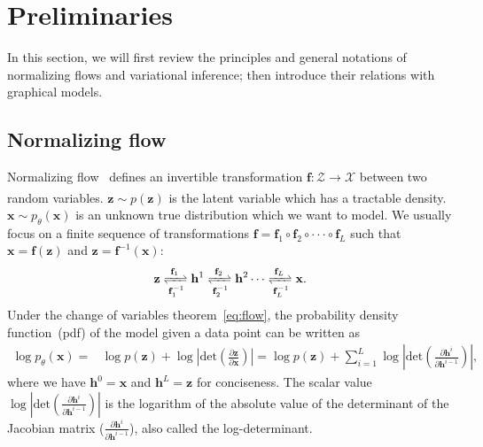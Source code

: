\documentclass{article} %
\begin{document}
\section{Preliminaries}
In this section, we will first review the principles and general notations of normalizing flows and variational inference; then introduce their relations with graphical models.
\subsection{Normalizing flow}
Normalizing flow~\citep{kingma2018glow,rezende2015variational} defines an invertible transformation $\mathbf{f}: \mathcal{Z} \xrightarrow[]{} \mathcal{X}$ between two random variables. $\mathbf{z} \sim p(\mathbf{z})$ is the latent variable which has a tractable density. $\mathbf{x} \sim p_\theta(\mathbf{x})$ is an unknown true distribution which we want to model. We usually focus on a finite sequence of transformations $\mathbf{f}=\mathbf{f}_1  \circ \mathbf{f}_2 \circ   \cdot  \cdot \cdot     \circ   \mathbf{f}_L$ such that $\mathbf{x}=\mathbf{f}(\mathbf{z})$ and $\mathbf{z}=\mathbf{f}^{-1}(\mathbf{x})$:
\begin{align*}
    \mathbf{z} \xrightleftharpoons[\mathbf{f}_1^{-1}]{\mathbf{f}_1} \mathbf{h}^1 \xrightleftharpoons[\mathbf{f}_2^{-1}]{\mathbf{f}_2} \mathbf{h}^2 \cdots \xrightleftharpoons[\mathbf{f}_L^{-1}]{\mathbf{f}_L}\mathbf{x}.
\end{align*}
Under the change of variables theorem~\eqref{eq:flow}, the probability density function~(pdf) of the model given a data point can be written as 
\begin{align}\label{eq:flow}
\log p_\theta(\mathbf{x}) =& \log p(\mathbf{z})  + \log | \text{det} ( \frac{\partial \mathbf{z} }{\partial \mathbf{x}} ) | 
=  \log p(\mathbf{z}) + \sum_{i=1}^L\log | \text{det} ( \frac{\partial \mathbf{h}^i } {\partial \mathbf{h}^{i-1}}) | ,
\end{align}
where we have $\mathbf{h}^0 = \mathbf{x}$ and $\mathbf{h}^L = \mathbf{z}$ for conciseness. The scalar value $\log |\text{det}( \frac{\partial \mathbf{h}^i}{\partial \mathbf{h}^{i-1}})|$ is the logarithm of the absolute value of the determinant of the Jacobian matrix ($\frac{\partial \mathbf{h}^i}{ \partial\mathbf{h}^{i-1}}$), also called the log-determinant. 
\end{document}
